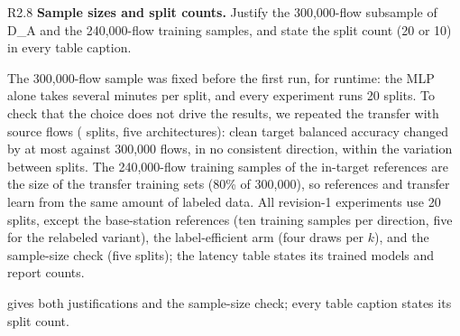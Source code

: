 \label{rv:R2.8}
\begin{concern}{R2.8}
\textbf{Sample sizes and split counts.} Justify the 300,000-flow subsample of D\_A and the 240,000-flow training samples, and state the split count (20 or 10) in every table caption.
\end{concern}
\response The 300,000-flow sample was fixed before the first run, for runtime: the MLP alone takes several minutes per split, and every experiment runs 20 splits. To check that the choice does not drive the results, we repeated the transfer with \RSzNlist{} source flows (\RSzSplits{} splits, five architectures): clean target balanced accuracy changed by at most \RSzMaxChangeClean{} against 300,000 flows, in no consistent direction, within the variation between splits. The 240,000-flow training samples of the in-target references are the size of the transfer training sets (80\% of 300,000), so references and transfer learn from the same amount of labeled data. All revision-1 experiments use 20 splits, except the base-station references (ten training samples per direction, five for the relabeled variant), the label-efficient arm (four draws per $k$), and the sample-size check (five splits); the latency table states its trained models and report counts.

\action {} gives both justifications and the sample-size check; every table caption states its split count.
